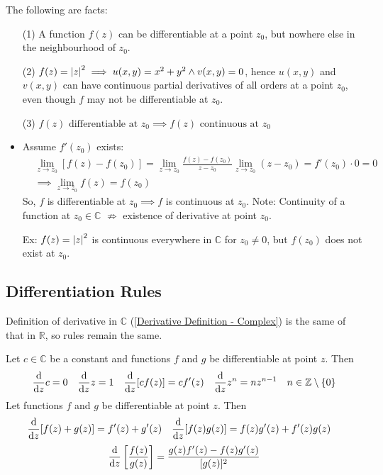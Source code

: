 \documentclass[12pt, english]{book}
\makeatletter
\renewenvironment{proof}[1][\proofname]{\par
	\pushQED{\qed}%
	\normalfont \topsep6\p@\@plus6\p@\relax
	\list{}{%
		\settowidth{\leftmargin}{\itshape\proofname:\hskip\labelsep}%
		\setlength{\labelwidth}{0pt}%
		\setlength{\itemindent}{-\leftmargin}%
		}%
	\item[\hskip\labelsep\itshape#1\@addpunct{:}]\ignorespaces
	}{\popQED\endlist\@endpefalse}
\makeatother
\begin{document}
	\begin{remark}
		The following are facts:
		\begin{itemize}
			\item[(1)] A function $f(z)$ can be differentiable at a point $z_0$, but nowhere else in the neighbourhood of $z_0$.
			\item[(2)] \(f(z) = \abs{z}^2 \implies u(x,y) = x^2 + y^2 \land v(x,y) = 0 \), hence $u(x,y)$ and $v(x,y)$ can have continuous partial derivatives of all orders at a point $z_0$, even though $f$ may not be differentiable at $z_0$.
			\item[(3)]
			\( f(z) \text{ differentiable at } z_0 \implies f(z) \text{ continuous at } z_0 \)
			\begin{proof}
				Assume \( f'(z_0) \) exists: 
				\begin{align*}
					&\lim_{z \rightarrow z_0} [f(z) - f(z_0)] = \lim_{z \rightarrow z_0} \frac{f(z) - f(z_0)}{z - z_0} \lim_{z \rightarrow z_0} (z - z_0) = f'(z_0) \cdot 0 = 0\\
					&\implies \lim_{z \rightarrow z_0} f(z) = f(z_0)
				\end{align*}
			So, $f$ is differentiable at \(z_0 \implies f \) is continuous at \(z_0\).
			\end{proof}
			Note: Continuity of a function  at \(z_0 \in \mathbb{C}\) $\nRightarrow$ existence of derivative at point \(z_0\). 
			
			Ex: \(f(z) = \abs{z}^2 \) is continuous everywhere in $\mathbb{C}$ for \(z_0 \neq 0\), but \(f(z_0) \) does not exist at \(z_0\). 
		\end{itemize}
	\end{remark}

	\subsection{Differentiation Rules} \label{Differentiation Rules Subsection - Complex}
	Definition of derivative in \(\mathbb{C}\) (\cref{Derivative Definition - Complex}) is the same of that in \(\mathbb{R}\), so rules remain the same.
	
	Let \(c \in \mathbb{C}\) be a constant and functions \(f\) and \(g\) be differentiable at point \(z\). Then
	\begin{align*}
		\dv{z} c &= 0 & \dv{z} z &= 1 & \dv{z} [cf(z)] &= cf'(z) & \dv{z} z^n &= nz^{n-1} & n \in \mathbb{Z}\setminus\{0\}
	\end{align*}
	Let functions \(f\) and \(g\) be differentiable at point \(z\). Then
	\begin{align*}
		\dv{z} [f(z) + g(z)] &= f'(z) + g'(z) & \dv{z}[f(z)g(z)] &= f(z)g'(z) + f'(z)g(z) 
	\end{align*}
	\begin{align*}
		\dv{z}\left[\frac{f(z)}{g(z)}\right] = \frac{g(z)f'(z) - f(z)g'(z)}{[g(z)]^2}
	\end{align*}
	
\end{document}
